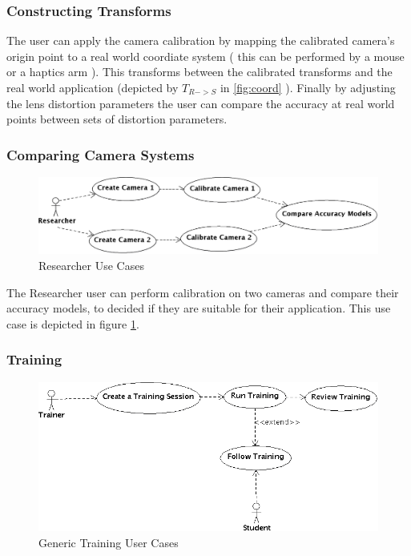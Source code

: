 \documentclass[11pt]{report}
\begin{document}
\subsubsection{Constructing Transforms}
The user can apply the camera calibration by mapping the calibrated camera's origin point to a real world coordiate system ( this can be performed by a mouse or a haptics arm ). 
This transforms between the calibrated transforms and the real world application (depicted by \( T_{R->S} \) in \ref{fig:coord} ). Finally by adjusting the lens distortion parameters the user can compare the accuracy at real world points between sets of distortion parameters.  

\subsubsection{Comparing Camera Systems} 

\begin{figure}[htp]
\centering
\includegraphics[scale=0.15]{images/CompareCameras.png}
\caption{Researcher Use Cases}
\label{fig:ucc}
\end{figure}

The Researcher user can perform calibration on two cameras and compare their accuracy models, to decided if they are suitable for their application. This use case is depicted in figure \ref{fig:ucc}.

\subsubsection{Training}

\begin{figure}[htp]
\centering
\includegraphics[scale=0.45]{images/Training.png}
\caption{Generic Training User Cases}
\label{fig:uco}
\end{figure}
\end{document}
